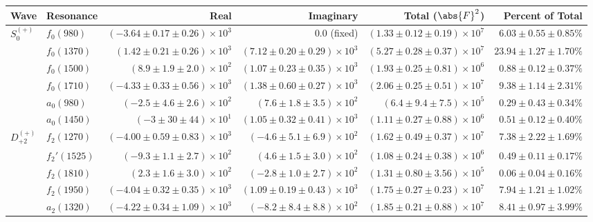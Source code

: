 \begin{table}[ht]
    \begin{center}
        \begin{tabular}{llrrrr}\toprule
        Wave & Resonance & Real & Imaginary & Total ($\abs{F}^2$) & Percent of Total \\\midrule
$S_{0}^{(+)}$ & $f_{0}(980)$ & $(-3.64 \pm 0.17 \pm 0.26) \times 10^{3}$ & $0.0$ (fixed) & $(1.33 \pm 0.12 \pm 0.19) \times 10^{7}$ & $6.03 \pm 0.55 \pm 0.85 \%$ \\
 & $f_{0}(1370)$ & $(1.42 \pm 0.21 \pm 0.26) \times 10^{3}$ & $(7.12 \pm 0.20 \pm 0.29) \times 10^{3}$ & $(5.27 \pm 0.28 \pm 0.37) \times 10^{7}$ & $23.94 \pm 1.27 \pm 1.70 \%$ \\
 & $f_{0}(1500)$ & $(8.9 \pm 1.9 \pm 2.0) \times 10^{2}$ & $(1.07 \pm 0.23 \pm 0.35) \times 10^{3}$ & $(1.93 \pm 0.25 \pm 0.81) \times 10^{6}$ & $0.88 \pm 0.12 \pm 0.37 \%$ \\
 & $f_{0}(1710)$ & $(-4.33 \pm 0.33 \pm 0.56) \times 10^{3}$ & $(1.38 \pm 0.60 \pm 0.27) \times 10^{3}$ & $(2.06 \pm 0.25 \pm 0.51) \times 10^{7}$ & $9.38 \pm 1.14 \pm 2.31 \%$ \\
 & $a_{0}(980)$ & $(-2.5 \pm 4.6 \pm 2.6) \times 10^{2}$ & $(7.6 \pm 1.8 \pm 3.5) \times 10^{2}$ & $(6.4 \pm 9.4 \pm 7.5) \times 10^{5}$ & $0.29 \pm 0.43 \pm 0.34 \%$ \\
 & $a_{0}(1450)$ & $(-3 \pm 30 \pm 44) \times 10^{1}$ & $(1.05 \pm 0.32 \pm 0.41) \times 10^{3}$ & $(1.11 \pm 0.27 \pm 0.88) \times 10^{6}$ & $0.51 \pm 0.12 \pm 0.40 \%$ \\
$D_{+2}^{(+)}$ & $f_{2}(1270)$ & $(-4.00 \pm 0.59 \pm 0.83) \times 10^{3}$ & $(-4.6 \pm 5.1 \pm 6.9) \times 10^{2}$ & $(1.62 \pm 0.49 \pm 0.37) \times 10^{7}$ & $7.38 \pm 2.22 \pm 1.69 \%$ \\
 & $f_{2}'(1525)$ & $(-9.3 \pm 1.1 \pm 2.7) \times 10^{2}$ & $(4.6 \pm 1.5 \pm 3.0) \times 10^{2}$ & $(1.08 \pm 0.24 \pm 0.38) \times 10^{6}$ & $0.49 \pm 0.11 \pm 0.17 \%$ \\
 & $f_{2}(1810)$ & $(2.3 \pm 1.6 \pm 3.0) \times 10^{2}$ & $(-2.8 \pm 1.0 \pm 2.7) \times 10^{2}$ & $(1.31 \pm 0.80 \pm 3.56) \times 10^{5}$ & $0.06 \pm 0.04 \pm 0.16 \%$ \\
 & $f_{2}(1950)$ & $(-4.04 \pm 0.32 \pm 0.35) \times 10^{3}$ & $(1.09 \pm 0.19 \pm 0.43) \times 10^{3}$ & $(1.75 \pm 0.27 \pm 0.23) \times 10^{7}$ & $7.94 \pm 1.21 \pm 1.02 \%$ \\
 & $a_{2}(1320)$ & $(-4.22 \pm 0.34 \pm 1.09) \times 10^{3}$ & $(-8.2 \pm 8.4 \pm 8.8) \times 10^{2}$ & $(1.85 \pm 0.21 \pm 0.88) \times 10^{7}$ & $8.41 \pm 0.97 \pm 3.99 \%$ \\

\end{tabular}
\end{center}
\end{table}
